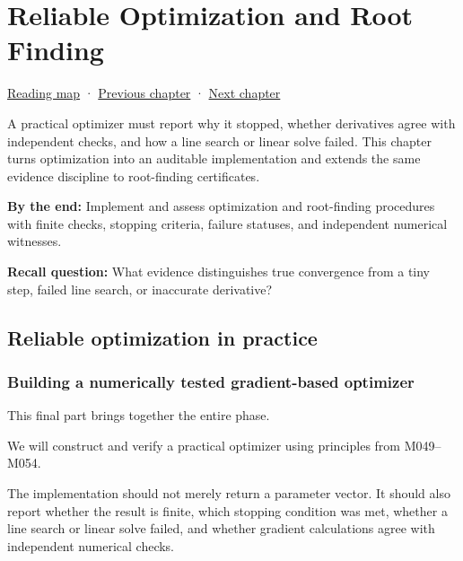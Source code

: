 \chapter{Reliable Optimization and Root Finding}\label{02-foundations-ii-ch028-reliable-optimization-and-root-finding}\hypertarget{02-foundations-ii-ch028}{}\label{stagechapter:02-foundations-ii-ch028}

\hyperref[volume-reading-map]{Reading map} · \hyperref[02-foundations-ii-ch027-gaussnewton-for-geometry-and-pose]{Previous chapter} · \hyperref[02-foundations-ii-ch029-discretization-convergence-and-experimental-design]{Next chapter}

A practical optimizer must report why it stopped, whether derivatives agree with independent checks, and how a line search or linear solve failed. This chapter turns optimization into an auditable implementation and extends the same evidence discipline to root-finding certificates.

\textbf{By the end:} Implement and assess optimization and root-finding procedures with finite checks, stopping criteria, failure statuses, and independent numerical witnesses.

\textbf{Recall question:} What evidence distinguishes true convergence from a tiny step, failed line search, or inaccurate derivative?

\section{Reliable optimization in practice}\label{02-foundations-ii-ch028-reliable-optimization-in-practice}

\subsection{Building a numerically tested gradient-based optimizer}\label{02-foundations-ii-ch028-building-a-numerically-tested-gradient-based-optimizer}

This final part brings together the entire phase.

We will construct and verify a practical optimizer using principles from M049--M054.

The implementation should not merely return a parameter vector. It should also report whether the result is finite, which stopping condition was met, whether a line search or linear solve failed, and whether gradient calculations agree with independent numerical checks.

